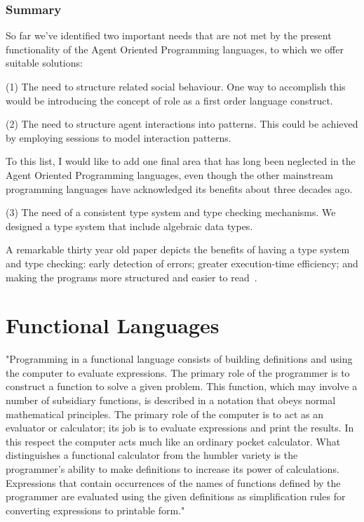 \documentclass[a4paper,12pt,oneside,fleqn]{book} %
\begin{document}
\subsection{Summary} %
So far we've identified two important needs that are not met by the
present functionality of the Agent Oriented Programming languages, to which
we offer suitable solutions:

(1) The need to structure related social behaviour. One way to accomplish
this would be introducing the concept of role as a first order language
construct.

(2) The need to structure agent interactions into patterns. This could be
achieved by employing sessions to model interaction patterns.

To this list, I would like to add one final area that has long been
neglected in the Agent Oriented Programming languages, even though the
other mainstream programming languages have acknowledged its benefits about
three decades ago.

(3) The need of a consistent type system and type checking mechanisms. We
designed a type system that include algebraic data types.


A remarkable thirty year old paper depicts the benefits of having a type
system and type checking: early detection of errors; greater execution-time
efficiency; and making the programs more structured and easier to
read~\cite{DBLP:journals/csur/CardelliW85}.

\chapter{Functional Languages}\label{ch:flang} %

"Programming in a functional language consists of building definitions and
using the computer to evaluate expressions. The primary role of the
programmer is to construct a function to solve a given problem. This
function, which may involve a number of subsidiary functions, is described
in a notation that obeys normal mathematical principles. The primary role
of the computer is to act as an evaluator or calculator; its job is to
evaluate expressions and print the results. In this respect the computer
acts much like an ordinary pocket calculator. What distinguishes a
functional calculator from the humbler variety is the programmer's ability
to make definitions to increase its power of calculations. Expressions that
contain occurrences of the names of functions defined by the programmer are
evaluated using the given definitions as simplification rules for converting
expressions to printable form."~\cite{bird1988introduction}
\end{document}
